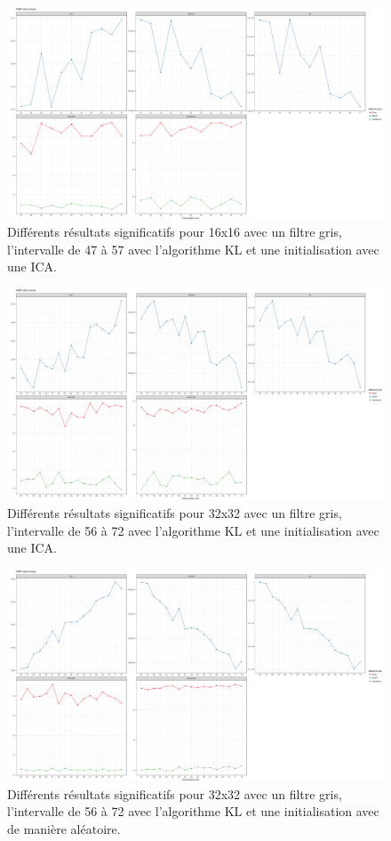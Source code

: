 \documentclass[runningheads]{llncs}
\begin{document}
\begin{figure}
\includegraphics[width=\textwidth]{nmf-16-greyscale-47-57-KL-ica.png}
\caption{Différents r\'esultats significatifs pour 16x16 avec un filtre gris, l'intervalle de 47 à 57 avec l'algorithme KL et une initialisation avec une ICA.} \label{fig6}
\end{figure}

\begin{figure}
\includegraphics[width=\textwidth]{nmf-32-greyscale-56-72-KL-ica.png}
\caption{Différents r\'esultats significatifs pour 32x32 avec un filtre gris, l'intervalle de 56 à 72 avec l'algorithme KL et une initialisation avec une ICA.} \label{fig6}
\end{figure}

\begin{figure}
\includegraphics[width=\textwidth]{nmf-32-greyscale-56-72-KL-random.png}
\caption{Différents r\'esultats significatifs pour 32x32 avec un filtre gris, l'intervalle de 56 à 72 avec l'algorithme KL et une initialisation avec de manière aléatoire.} \label{fig6}
\end{figure}
\end{document}
